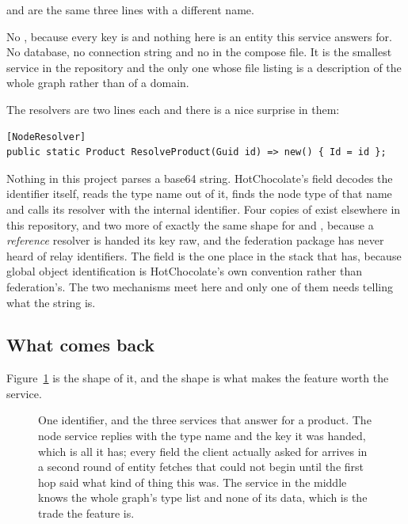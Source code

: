  and  are the same three lines with a different name.

No , because every key is  and nothing
here is an entity this service answers for. No database, no connection string and
no  in the compose file. It is the smallest service in the
repository and the only one whose file listing is a description of the whole
graph rather than of a domain.

%
The resolvers are two lines each and there is a nice surprise in them:

\begin{verbatim}
[NodeResolver]
public static Product ResolveProduct(Guid id) => new() { Id = id };
\end{verbatim}

Nothing in this project parses a base64 string. HotChocolate's  field
decodes the identifier itself, reads the type name out of it, finds the node type
of that name and calls its resolver with the internal identifier. Four copies of
 exist elsewhere in this repository, and two more of
exactly the same shape for  and , because a
\emph{reference} resolver is handed its key raw, and the federation package has
never heard of relay identifiers. The
 field is the one place in the stack that has, because global object
identification is HotChocolate's own convention rather than federation's. The
two mechanisms meet here and only one of them needs telling what the string is.

\subsection*{What comes back}

Figure~\ref{fig:ch13-node-dispatch} is the shape of it, and the shape is what
makes the feature worth the service.

\begin{figure}[htbp]
  \centering
  
  \caption{One identifier, and the three services that answer for a product.
  The node service replies with the type name and the key it was handed, which
  is all it has; every field the client actually asked for arrives in a second
  round of entity fetches that could not begin until the first hop said what
  kind of thing this was. The service in the middle knows the whole graph's type
  list and none of its data, which is the trade the feature is.}
  \label{fig:ch13-node-dispatch}
\end{figure}

